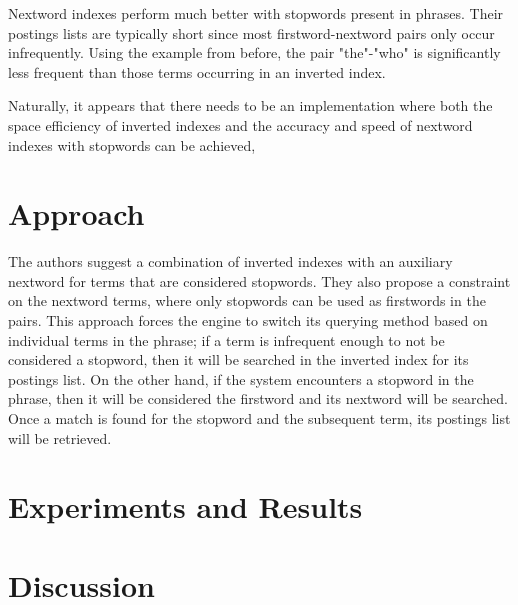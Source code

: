 \documentclass[11pt]{article}
\begin{document}
    Nextword indexes perform much better with stopwords present in phrases. Their postings lists are typically short since most firstword-nextword pairs only occur infrequently. Using the example from before, the pair "the"-"who" is significantly less frequent than those terms occurring in an inverted index.

    Naturally, it appears that there needs to be an implementation where both the space efficiency of inverted indexes and the accuracy and speed of nextword indexes with stopwords can be achieved,

    \section*{Approach}

    The authors suggest a combination of inverted indexes with an auxiliary nextword for terms that are considered stopwords. They also propose a constraint on the nextword terms, where only stopwords can be used as firstwords in the pairs. This approach forces the engine to switch its querying method based on individual terms in the phrase; if a term is infrequent enough to not be considered a stopword, then it will be searched in the inverted index for its postings list. On the other hand, if the system encounters a stopword in the phrase, then it will be considered the firstword and its nextword will be searched. Once a match is found for the stopword and the subsequent term, its postings list will be retrieved.

    \section*{Experiments and Results}

    \section*{Discussion}
\end{document}
